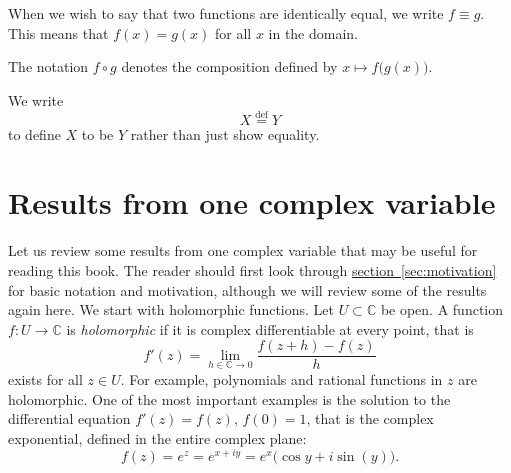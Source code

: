 \documentclass[12pt,openany]{book}
\newcommand{\C}{{\mathbb{C}}}
\theoremstyle{plain}
\theoremstyle{remark}
\theoremstyle{definition}
\theoremstyle{exercise}
\theoremstyle{example}
\newcommand{\sectionref}[1]{\hyperref[#1]{section~\ref*{#1}}}
\begin{document}
When we wish to say that two functions are identically equal, we write
%
$f \equiv g$.  This means that $f(x) = g(x)$ for all $x$ in the domain.

The notation
%
$f \circ g$ denotes the composition defined by $x \mapsto
f\bigl(g(x)\bigr)$.

We write
\begin{equation*}
X
\overset{\text{def}}{=}
Y
\end{equation*}
to define $X$ to be $Y$ rather than just show equality.






\chapter{Results from one complex variable} \label{ap:onevarresults}


Let us review some results from one complex variable that may be useful for
reading this book.
The reader should first look through \sectionref{sec:motivation}
for basic notation and motivation, although we will review some of the
results again here.  We start with holomorphic functions.
Let $U \subset \C$ be open.
A function
$f \colon U \to \C$ is \emph{holomorphic} if it is complex
differentiable at every point, that is
\begin{equation*}
f'(z) = \lim_{h \in \C \to 0} \frac{f(z+h) - f(z)}{h}
\end{equation*}
exists for all $z \in U$.  For example, polynomials and rational
functions in $z$ are holomorphic.  One of the most important examples
is the solution to the differential equation $f'(z) = f(z)$, $f(0) = 1$, that is
the complex exponential, defined in the entire complex plane:
\begin{equation*}
f(z) = e^z = e^{x+iy} = e^x \bigl( \cos y + i \sin(y) \bigr) .
\end{equation*}
\end{document}

